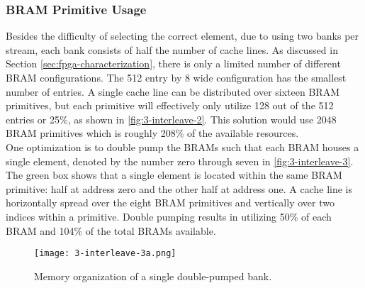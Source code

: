\subsubsection{BRAM Primitive Usage}
Besides the difficulty of selecting the correct element, due to using two banks per stream, each bank consists of half the number of cache lines. As discussed in Section \ref{sec:fpga-characterization}, there is only a limited number of different BRAM configurations. The 512 entry by \SI{8}{\byte} wide configuration has the smallest number of entries. A single cache line can be distributed over sixteen BRAM primitives, but each primitive will effectively only utilize 128 out of the 512 entries or 25\%, as shown in \autoref{fig:3-interleave-2}. This solution would use 2048 BRAM primitives which is roughly 208\% of the available resources.\\
One optimization is to double pump the BRAMs such that each BRAM houses a single element, denoted by the number zero through seven in \autoref{fig:3-interleave-3}. The green box shows that a single element is located within the same BRAM primitive: half at address zero and the other half at address one. A cache line is horizontally spread over the eight BRAM primitives and vertically over two indices within a primitive. Double pumping results in utilizing 50\% of each BRAM and 104\% of the total BRAMs available.

\begin{figure}[H]
  \centering
  \texttt{[image: 3-interleave-3a.png]}
  \caption{Memory organization of a single double-pumped bank.}
  \label{fig:3-interleave-3}
\end{figure}



